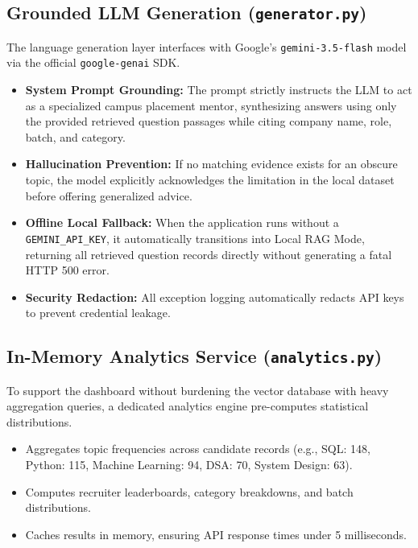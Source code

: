\documentclass[11pt]{article}
\begin{document}
\subsection{Grounded LLM Generation (\texttt{generator.py})}
The language generation layer interfaces with Google's \texttt{gemini-3.5-flash} model via the official \texttt{google-genai} SDK.
\begin{itemize}[leftmargin=1.5em]
    \item \textbf{System Prompt Grounding:} The prompt strictly instructs the LLM to act as a specialized campus placement mentor, synthesizing answers using only the provided retrieved question passages while citing company name, role, batch, and category.
    \item \textbf{Hallucination Prevention:} If no matching evidence exists for an obscure topic, the model explicitly acknowledges the limitation in the local dataset before offering generalized advice.
    \item \textbf{Offline Local Fallback:} When the application runs without a \texttt{GEMINI\_API\_KEY}, it automatically transitions into Local RAG Mode, returning all retrieved question records directly without generating a fatal HTTP 500 error.
    \item \textbf{Security Redaction:} All exception logging automatically redacts API keys to prevent credential leakage.
\end{itemize}

\subsection{In-Memory Analytics Service (\texttt{analytics.py})}
To support the dashboard without burdening the vector database with heavy aggregation queries, a dedicated analytics engine pre-computes statistical distributions.
\begin{itemize}[leftmargin=1.5em]
    \item Aggregates topic frequencies across candidate records (e.g., SQL: 148, Python: 115, Machine Learning: 94, DSA: 70, System Design: 63).
    \item Computes recruiter leaderboards, category breakdowns, and batch distributions.
    \item Caches results in memory, ensuring API response times under 5 milliseconds.
\end{itemize}
\end{document}
